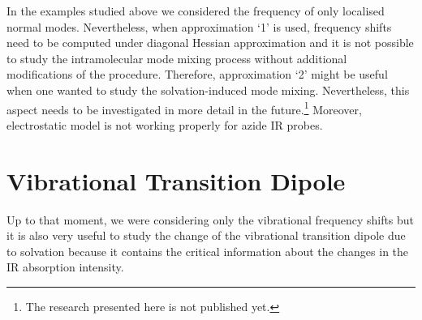\documentclass[a4paper,titlepage,twoside,fleqn,12pt]{book}
\begin{document}
\begin{refsection}
In the examples studied above we considered the frequency of only localised 
normal modes. Nevertheless, when approximation `1'
is used, frequency shifts need to be computed under diagonal Hessian approximation
and it is not possible to study the intramolecular mode mixing process without additional 
modifications of the procedure. Therefore, approximation `2' might be useful when one
wanted to study the solvation\hyp{}induced mode mixing. Nevertheless, this aspect needs to
be investigated in more detail in the future.\footnote{The research presented here is not published yet.}
Moreover, electrostatic model is not working properly for azide IR probes.

\section{Vibrational Transition Dipole\label{s:vibr-trans-dipole}}

Up to that moment, we were considering only the vibrational frequency shifts
but it is also very useful to study the change of the vibrational
transition dipole due to solvation because it contains the critical
information about the changes in the IR absorption intensity.


\end{refsection}
\end{document}
